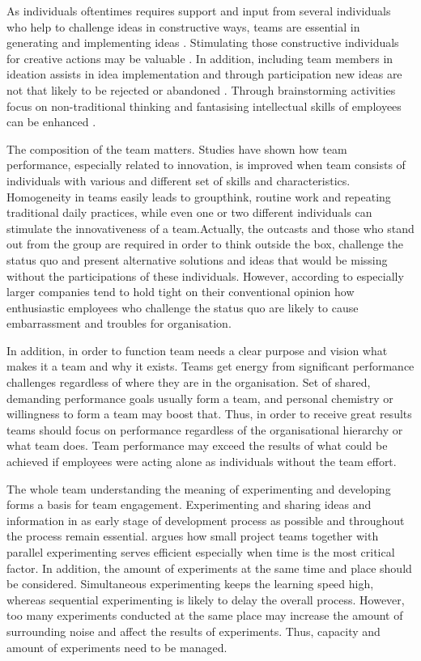 As individuals oftentimes requires support and input from several individuals who help to challenge ideas in constructive ways, teams are essential in generating and implementing ideas \citep{mumford2002social}. Stimulating those constructive individuals for creative actions may be valuable \citep{robinson1997corporate}. In addition, including team members in ideation assists in idea implementation and through participation new ideas are not that likely to be rejected or abandoned \citep{agrell1994team}. Through brainstorming activities focus on non-traditional thinking and fantasising intellectual skills of employees can be enhanced \citep{sosik1998transformational}.

The composition of the team matters. Studies have shown how team performance, especially related to innovation, is improved when team consists of individuals with various and different set of skills and characteristics\citep{buijs2007innovation}. Homogeneity in teams easily leads to groupthink, routine work and repeating traditional daily practices, while even one or two different individuals can stimulate the innovativeness of a team.Actually, the outcasts and those who stand out from the group are required in order to think outside the box, challenge the status quo and present alternative solutions and ideas that would be missing without the participations of these individuals. \citep{sternberg1997creativity} However, according to \citet{quinn1985managing} especially larger companies tend to hold tight on their conventional opinion how enthusiastic employees who challenge the status quo are likely to cause embarrassment and troubles for organisation.

In addition, in order to function team needs a clear purpose and vision what makes it a team and why it exists. Teams get energy from significant performance challenges regardless of where they are in the organisation. Set of shared, demanding performance goals usually form a team, and personal chemistry or willingness to form a team may boost that. Thus, in order to receive great results teams should focus on performance regardless of the organisational hierarchy or what team does. Team performance may exceed the results of what could be achieved if employees were acting alone as individuals without the team effort. \citep{katzenbach1993wisdom}

The whole team understanding the meaning of experimenting and developing forms a basis for team engagement. Experimenting and sharing ideas and information in as early stage of development process as possible and throughout the process remain essential. \citep{thomke2001enlightened} \citet{thomke2001enlightened} argues how small project teams together with parallel experimenting serves efficient especially when time is the most critical factor. In addition, the amount of experiments at the same time and place should be considered. Simultaneous experimenting keeps the learning speed high, whereas sequential experimenting is likely to delay the overall process. However, too many experiments conducted at the same place may increase the amount of surrounding noise and affect the results of experiments. Thus, capacity and amount of experiments need to be managed. \citep{thomke2003r}

